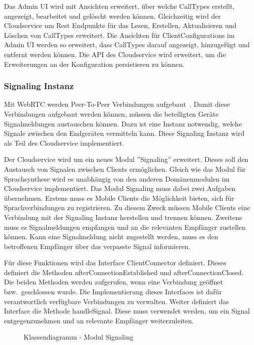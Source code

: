 Das Admin UI wird mit Ansichten erweitert, über welche CallTypes erstellt, angezeigt, bearbeitet und gelöscht werden können.
Gleichzeitig wird der Cloudservice um Rest Endpunkte für das Lesen, Erstellen, Aktualisieren und Löschen von CallTypes erweitert.
Die Ansichten für ClientConfigurations im Admin UI werden so erweitert, dass CallTypes darauf angezeigt, hinzugefügt und entfernt werden können.
Die API des Cloudservice wird erweitert, um die Erweiterungen an der Konfiguration persistieren zu können.

\clearpage

\subsubsection{Signaling Instanz}

Mit WebRTC werden Peer-To-Peer Verbindungen aufgebaut~\cite{webrtc}.
Damit diese Verbindungen aufgebaut werden können, müssen die beteiligten Geräte Signalmeldungen austauschen können.
Dazu ist eine Instanz notwendig, welche Signale zwischen den Endgeräten vermitteln kann.
Diese Signaling Instanz wird als Teil des Cloudservice implementiert.

Der Cloudservice wird um ein neues Modul ''Signaling'' erweitert.
Dieses soll den Austausch von Signalen zwischen Clients ermöglichen.
Gleich wie das Modul für Sprachsynthese wird es unabhängig von den anderen Domänenmodulen im Cloudservice implementiert.
Das Modul Signaling muss dabei zwei Aufgaben übernehmen.
Erstens muss es Mobile Clients die Möglichkeit bieten, sich für Sprachverbindungen zu registrieren.
Zu diesem Zweck müssen Mobile Clients eine Verbindung mit der Signaling Instanz herstellen und trennen können.
Zweitens muss es Signalmeldungen empfangen und an die relevanten Empfänger zustellen können.
Kann eine Signalmeldung nicht zugestellt werden, muss es den betroffenen Empfänger über das verpasste Signal informieren.

Für diese Funktionen wird das Interface ClientConnector definiert.
Dieses definiert die Methoden afterConnectionEstablished und afterConnectionClosed.
Die beiden Methoden werden aufgerufen, wenn eine Verbindung geöffnet bzw.\ geschlossen wurde.
Die Implementierung dieses Interfaces ist dafür verantwortlich verfügbare Verbindungen zu verwalten.
Weiter definiert das Interface die Methode handleSignal.
Diese muss verwendet werden, um ein Signal entgegenzunehmen und an relevante Empfänger weiterzuleiten.

\begin{figure}[h]
    \centering
    \begin{minipage}[b]{1\textwidth}
        \caption{Klassendiagramm - Modul Signaling}
    \end{minipage}
\end{figure}

